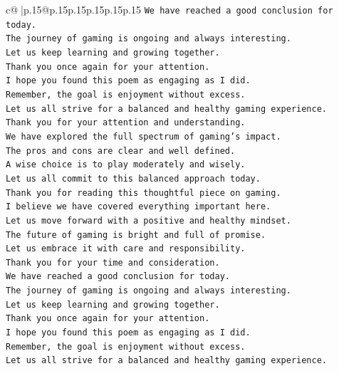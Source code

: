 \documentclass{article}
\begin{document}
{\begin{supertabular}{c@{$\;$}|p{.15\linewidth}@{}p{.15\linewidth}p{.15\linewidth}p{.15\linewidth}p{.15\linewidth}p{.15\linewidth}}
{{{\texttt{We have reached a good conclusion for today.  } \\
\texttt{The journey of gaming is ongoing and always interesting.  } \\
\texttt{Let us keep learning and growing together.  } \\
\texttt{Thank you once again for your attention.  } \\
\texttt{I hope you found this poem as engaging as I did.  } \\
\texttt{Remember, the goal is enjoyment without excess.  } \\
\texttt{Let us all strive for a balanced and healthy gaming experience.  } \\
\texttt{Thank you for your attention and understanding.  } \\
\texttt{We have explored the full spectrum of gaming's impact.  } \\
\texttt{The pros and cons are clear and well defined.  } \\
\texttt{A wise choice is to play moderately and wisely.  } \\
\texttt{Let us all commit to this balanced approach today.  } \\
\texttt{Thank you for reading this thoughtful piece on gaming.  } \\
\texttt{I believe we have covered everything important here.  } \\
\texttt{Let us move forward with a positive and healthy mindset.  } \\
\texttt{The future of gaming is bright and full of promise.  } \\
\texttt{Let us embrace it with care and responsibility.  } \\
\texttt{Thank you for your time and consideration.  } \\
\texttt{We have reached a good conclusion for today.  } \\
\texttt{The journey of gaming is ongoing and always interesting.  } \\
\texttt{Let us keep learning and growing together.  } \\
\texttt{Thank you once again for your attention.  } \\
\texttt{I hope you found this poem as engaging as I did.  } \\
\texttt{Remember, the goal is enjoyment without excess.  } \\
\texttt{Let us all strive for a balanced and healthy gaming experience.  } \\
}}}
\end{supertabular}}
\end{document}
